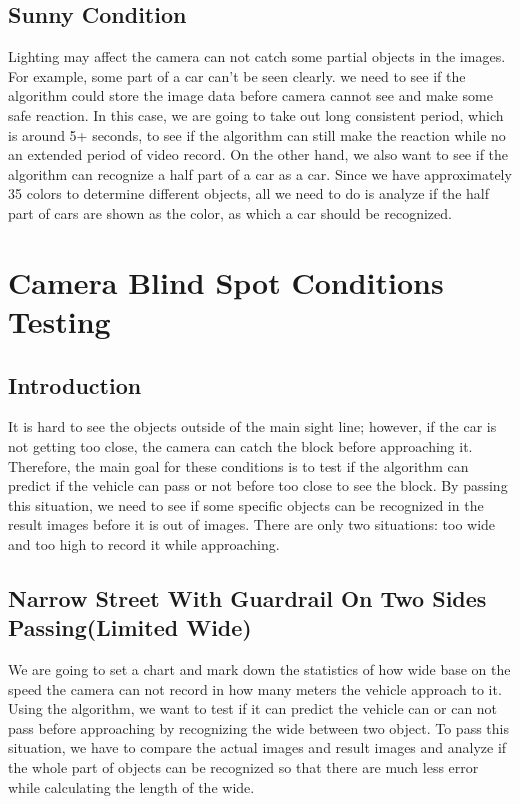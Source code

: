 \documentclass[10pt,draftclsnofoot,onecolumn,journal,compsoc]{IEEEtran}
\begin{document}
\subsection{Sunny Condition}
Lighting may affect the camera can not catch some partial objects in the images. 
For example, some part of a car can't be seen clearly.
we need to see if the algorithm could store the image data before camera cannot see and make some safe reaction.
In this case, we are going to take out long consistent period, which is around 5+ seconds, to see if the algorithm can still make the reaction while no an extended period of video record. 
On the other hand, we also want to see if the algorithm can recognize a half part of a car as a car.
Since we have approximately 35 colors to determine different objects, all we need to do is analyze if the half part of cars are shown as the color, as which a car should be recognized.  



\section{Camera Blind Spot Conditions Testing}
\subsection{Introduction}
It is hard to see the objects outside of the main sight line; however, if the car is not getting too close, the camera can catch the block before approaching it. Therefore, the main goal for these conditions is to test if the algorithm can predict if the vehicle can pass or not before too close to see the block. 
By passing this situation, we need to see if some specific objects can be recognized in the result images before it is out of images.
There are only two situations: too wide and too high to record it while approaching.

\subsection{Narrow Street With Guardrail On Two Sides Passing(Limited Wide)}
We are going to set a chart and mark down the statistics of how wide base on the speed the camera can not record in how many meters the vehicle approach to it. Using the algorithm, we want to test if it can predict the vehicle can or can not pass before approaching by recognizing the wide between two object.
To pass this situation, we have to compare the actual images and result images and analyze if the whole part of objects can be recognized so that there are much less error while calculating the length of the wide.
\end{document}
